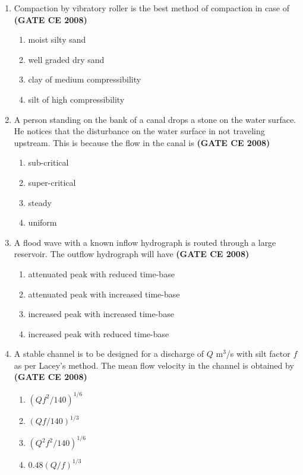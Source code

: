 \documentclass[journal]{IEEEtran}
\begin{document}
\begin{enumerate}
\item 
Compaction by vibratory roller is the best method of compaction in case of  \textbf{(GATE CE 2008)}
\begin{multicols}{2}
\begin{enumerate}
\item moist silty sand
\item well graded dry sand
\item clay of medium compressibility
\item silt of high compressibility
\end{enumerate}
\end{multicols}

\item A person standing on the bank of a canal drops a stone on the water surface. He notices that the disturbance on the water surface in not traveling upstream. This is because the flow in the canal is \textbf{(GATE CE 2008)}
\begin{multicols}{2}
\begin{enumerate}
\item sub-critical
\item super-critical 
\item steady 
\item uniform
\end{enumerate}
\end{multicols}


\item A flood wave with a known inflow hydrograph is routed through a large reservoir. The outflow hydrograph will have \textbf{(GATE CE 2008)}

\begin{enumerate}
\item attenuated peak with reduced time-base 
\item attenuated peak with increased time-base 
\item increased peak with increased time-base 
\item increased peak with reduced time-base

\end{enumerate}


\item A stable channel is to be designed for a discharge of $Q$ m$^{3}$/s with silt factor $f$ as per Lacey's method. The mean flow velocity  in the channel is obtained by \textbf{(GATE CE 2008)}
\begin{multicols}{2}
\begin{enumerate}
\item $(Qf^{2}/140)^{1/6}$ 
\item $(Qf/140)^{1/3}$ 
\item $(Q^{2}f^{2}/140)^{1/6}$ 
\item $0.48(Q/f)^{1/3}$
\end{enumerate}
\end{multicols}


\end{enumerate}
\end{document}
